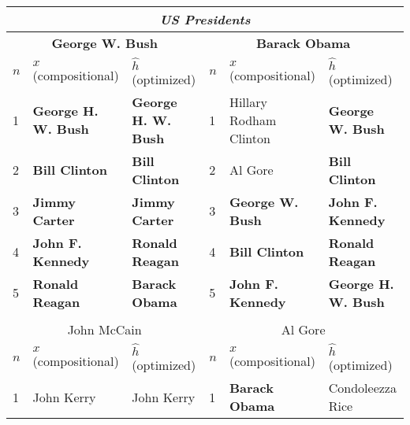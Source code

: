 \documentclass[a4paper,10pt]{article}
\begin{document}
\begin{table*} 
\begin{tabular}{lll | lll} 
\multicolumn{6}{c}{ \emph{US Presidents} } \\ \hline\hline
 \multicolumn{3}{c}{\small \textbf{George W. Bush}} & \multicolumn{3}{c}{\small \textbf{Barack Obama}}  \\  \hline
 \multicolumn{1}{l}{\small $n$} & \multicolumn{1}{l}{\small \textbf{$x$} (compositional)} & \multicolumn{1}{l|}{\small \textbf{$\hat{h}$} (optimized)} & \multicolumn{1}{l}{\small $n$} & \multicolumn{1}{l}{\small \textbf{$x$} (compositional)} & \multicolumn{1}{l}{\small \textbf{$\hat{h}$} (optimized)}\\ \hline 
  {\scriptsize 1 } & { \scriptsize \textbf{George H. W. Bush} } & { \scriptsize \textbf{George H. W. Bush}} &  {\scriptsize 1 } & { \scriptsize Hillary Rodham Clinton } & { \scriptsize \textbf{George W. Bush}} \\ 
 {\scriptsize 2 } & { \scriptsize \textbf{Bill Clinton} } & { \scriptsize \textbf{Bill Clinton}} &  {\scriptsize 2 } & { \scriptsize Al Gore } & { \scriptsize \textbf{Bill Clinton}}\\ 
 {\scriptsize 3 } & { \scriptsize \textbf{Jimmy Carter} } & { \scriptsize \textbf{Jimmy Carter}} &  {\scriptsize 3 } & { \scriptsize \textbf{George W. Bush} } & { \scriptsize \textbf{John F. Kennedy}}\\ 
 {\scriptsize 4 } & { \scriptsize \textbf{John F. Kennedy} } & { \scriptsize \textbf{Ronald Reagan}} &  {\scriptsize 4 } & { \scriptsize \textbf{Bill Clinton} } & { \scriptsize \textbf{Ronald Reagan}}\\ 
 {\scriptsize 5 } & { \scriptsize \textbf{Ronald Reagan} } & { \scriptsize \textbf{Barack Obama}} &  {\scriptsize 5 } & { \scriptsize \textbf{John F. Kennedy} } & { \scriptsize \textbf{George H. W. Bush}}\\ \hline
 \\
 \multicolumn{3}{c}{\small John McCain} & \multicolumn{3}{c}{\small Al Gore}  \\ \hline
 \multicolumn{1}{l}{\small $n$} & \multicolumn{1}{l}{\small \textbf{$x$} (compositional)} & \multicolumn{1}{l|}{\small \textbf{$\hat{h}$} (optimized)} & \multicolumn{1}{l}{\small $n$} & \multicolumn{1}{l}{\small \textbf{$x$} (compositional)} & \multicolumn{1}{l}{\small \textbf{$\hat{h}$} (optimized)} \\ \hline 
 {\scriptsize 1 } & { \scriptsize John Kerry } & { \scriptsize John Kerry} &  {\scriptsize 1 } & { \scriptsize \textbf{Barack Obama} } & { \scriptsize Condoleezza Rice} \\

\end{tabular}
\end{table*}
\end{document}
